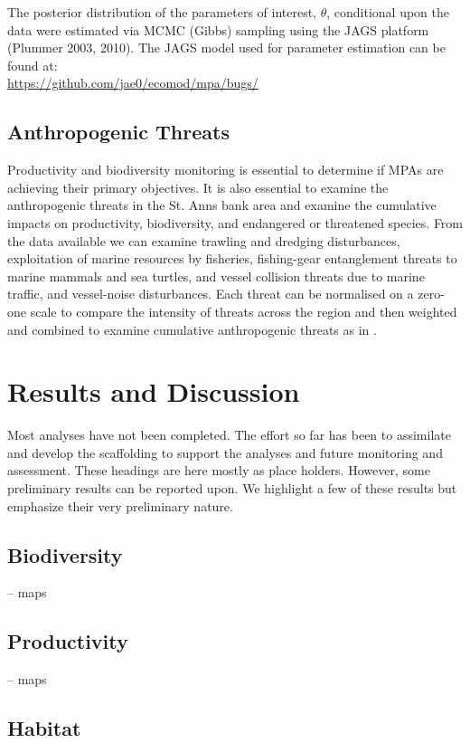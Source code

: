 \documentclass[letterpaper,portrait,11pt]{scrartcl}
\numberwithin{equation}{section}		%
\numberwithin{figure}{section}		%
\numberwithin{table}{section}				%
\begin{document}
The posterior distribution of the parameters of interest, $\theta$, conditional upon the data were estimated via MCMC (Gibbs) sampling using the JAGS platform (Plummer 2003, 2010). The JAGS model used for parameter estimation can be found at: \\

\url{https://github.com/jae0/ecomod/mpa/bugs/}

\subsection{Anthropogenic Threats}
Productivity and biodiversity monitoring is essential to determine if MPAs are achieving their primary objectives. It is also essential to examine the anthropogenic threats in the St. Anns bank area and examine the cumulative impacts on productivity, biodiversity, and endangered or threatened species.  From the data available we can examine trawling and dredging disturbances, exploitation of marine resources by fisheries, fishing-gear entanglement threats to marine mammals and sea turtles, and vessel collision threats due to marine traffic, and vessel-noise disturbances.  Each threat can be normalised on a zero-one scale to compare the intensity of threats across the region and then weighted and combined to examine cumulative anthropogenic threats as in \textcite{coll:2012:mediterranean}.

\section{Results and Discussion}

Most analyses have not been completed. The effort so far has been to assimilate and develop the scaffolding to support the analyses and future monitoring and assessment. These headings are here mostly as place holders. However, some preliminary results can be reported upon. We highlight a few of these results but emphasize their very preliminary nature. 

\subsection{Biodiversity}

-- maps

\subsection{Productivity}
-- maps


\subsection{Habitat}
\end{document}
